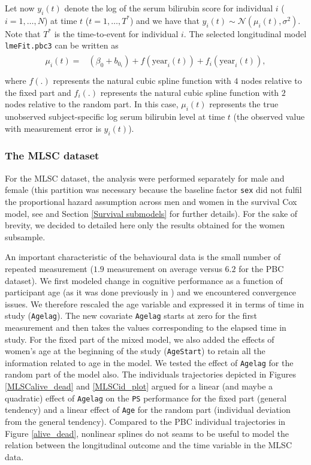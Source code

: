 \documentclass[12pt]{article}
\begin{document}
Let now $y_{i}(t)$ denote the log of the serum bilirubin score for individual $i$ ($i=1, \dots, N$) at time $t$ ($t=1, \dots, T^{*}$) and we have that $y_{i}(t) \sim \mathcal{N}(\mu_i(t), \sigma^{2}) $. Note that $T^{*}$ is the time-to-event for individual $i$. The selected longitudinal model \texttt{lmeFit.pbc3} can be written as
\begin{equation}
\begin{split}
\begin{aligned}
\mu_i(t) = &(\beta_0 +b_{0_{i}} )+ f(\text{year}_i(t))+f_i(\text{year}_i(t)),\\
\end{aligned}
\end{split}
\label{Longitudinal model_pbc}
\end{equation}
where $f(.)$ represents the natural cubic spline function with $4$ nodes relative to the fixed part and $f_i(.)$ represents the natural cubic spline function with $2$ nodes relative to the random part. In this case, $\mu_i(t)$ represents the true unobserved subject-specific log serum bilirubin level at time $t$ (the observed value with measurement error is $y_{i}(t)$).


\subsubsection{The MLSC dataset}

For the MLSC dataset, the analysis were performed separately for male and female (this partition was necessary because the baseline factor \texttt{sex} did not fulfil the proportional hazard assumption across men and women in the survival Cox model, see \cite{aichele2015life} and Section \ref{Survival submodels} for further details). For the sake of brevity, we decided  to detailed here only the results obtained for the women subsample.

An important characteristic of the behavioural data is the small number of repeated measurement ($1.9$ measurement on average versus $6.2$ for the PBC dataset). We first modeled change in cognitive performance as a function of participant age (as it was done previously in \cite{aichele2015life}) and we encountered convergence issues. We therefore rescaled the age variable and expressed it in terms of time in study (\texttt{Agelag}). The new covariate \texttt{Agelag} starts at zero for the first measurement and then takes the values corresponding to the elapsed time in study. For the fixed part of the mixed model, we also added the effects of women's age at the beginning of the study (\texttt{AgeStart}) to retain all the information related to age in the model. We tested the effect of \texttt{Agelag} for the random part of the model also.
The individuals trajectories depicted in Figures \ref{MLSCalive_dead} and \ref{MLSCid_plot} argued for a linear (and maybe a quadratic) effect of \texttt{Agelag} on the \texttt{PS} performance for the fixed part (general tendency) and  a linear effect of \texttt{Age} for the random part (individual deviation from the general tendency). Compared to the PBC individual trajectories in Figure \ref{alive_dead}, nonlinear splines do not seams to be useful to model the relation between the longitudinal outcome and the time variable in the MLSC data.
\end{document}
